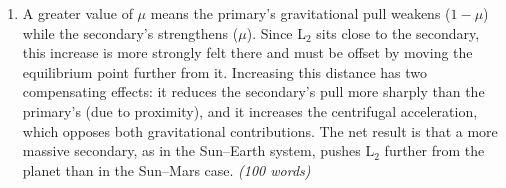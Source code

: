 \documentclass[a4paper,12pt]{article}
\begin{document}
\begin{enumerate}
    \item[\textbf{1.2}] A greater value of $\mu$ means the primary's gravitational pull weakens ($1-\mu$) while the secondary's strengthens ($\mu$).
    Since L$_2$ sits close to the secondary, this increase is more strongly felt there and must be offset by moving the equilibrium point further from it. 
    Increasing this distance has two compensating effects: it reduces the secondary's pull more sharply than the primary's (due to proximity), 
    and it increases the centrifugal acceleration, which opposes both gravitational contributions. The net result is that a more massive secondary, 
    as in the Sun--Earth system, pushes L$_2$ further from the planet than in the Sun--Mars case. \textit{(100 words)}

\end{enumerate}

\newpage
{}
\end{document}
